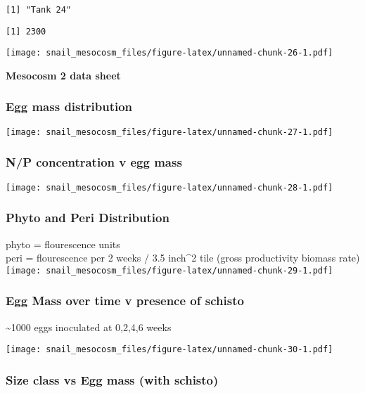 \documentclass[10,portrait]{article}
\begin{document}
\begin{verbatim}
[1] "Tank 24"
\end{verbatim}

\begin{verbatim}
[1] 2300
\end{verbatim}

\texttt{[image: snail\_mesocosm\_files/figure-latex/unnamed-chunk-26-1.pdf]}

\newpage    

\textbf{Mesocosm 2 data sheet}

\subsubsection{Egg mass distribution}\label{egg-mass-distribution}

\texttt{[image: snail\_mesocosm\_files/figure-latex/unnamed-chunk-27-1.pdf]}

\subsubsection{N/P concentration v egg
mass}\label{np-concentration-v-egg-mass}

\texttt{[image: snail\_mesocosm\_files/figure-latex/unnamed-chunk-28-1.pdf]}

\subsubsection{Phyto and Peri
Distribution}\label{phyto-and-peri-distribution}

phyto = flourescence units\\
peri = flourescence per 2 weeks / 3.5 inch\^{}2 tile (gross productivity
biomass rate)\\
\texttt{[image: snail\_mesocosm\_files/figure-latex/unnamed-chunk-29-1.pdf]}

\subsubsection{Egg Mass over time v presence of
schisto}\label{egg-mass-over-time-v-presence-of-schisto}

\textasciitilde{}1000 eggs inoculated at 0,2,4,6 weeks

\texttt{[image: snail\_mesocosm\_files/figure-latex/unnamed-chunk-30-1.pdf]}

\subsubsection{Size class vs Egg mass (with
schisto)}\label{size-class-vs-egg-mass-with-schisto}
\end{document}

